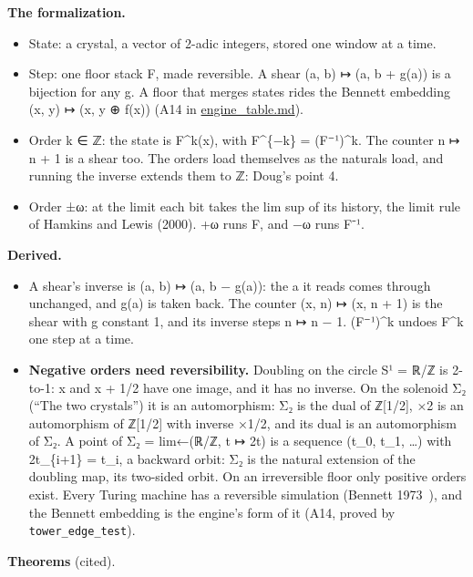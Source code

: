 \textbf{The formalization.}

\begin{itemize}
\item State: a crystal, a vector of 2-adic integers, stored one window at a time.
\item Step: one floor stack F, made reversible. A shear (a, b) ↦ (a, b + g(a)) is a bijection for any g. A floor that merges states rides the Bennett embedding (x, y) ↦ (x, y ⊕ f(x)) (A14 in \hyperref[chap:engine-table]{engine\_\allowbreak{}table.md}).
\item Order k ∈ ℤ: the state is F\textasciicircum{}k(x), with F\textasciicircum{}\{−k\} = (F⁻¹)\textasciicircum{}k. The counter n ↦ n + 1 is a shear too. The orders load themselves as the naturals load, and running the inverse extends them to ℤ: Doug's point 4.
\item Order ±ω: at the limit each bit takes the lim sup of its history, the limit rule of Hamkins and Lewis (2000). +ω runs F, and −ω runs F⁻¹.
\end{itemize}

\textbf{Derived.}

\begin{itemize}
\item A shear's inverse is (a, b) ↦ (a, b − g(a)): the a it reads comes through unchanged, and g(a) is taken back. The counter (x, n) ↦ (x, n + 1) is the shear with g constant 1, and its inverse steps n ↦ n − 1. (F⁻¹)\textasciicircum{}k undoes F\textasciicircum{}k one step at a time.
\item \textbf{Negative orders need reversibility.} Doubling on the circle S¹ = ℝ/ℤ is 2-to-1: x and x + 1/2 have one image, and it has no inverse. On the solenoid Σ₂ (“The two crystals”) it is an automorphism: Σ₂ is the dual of ℤ[1/2], ×2 is an automorphism of ℤ[1/2] with inverse ×1/2, and its dual is an automorphism of Σ₂. A point of Σ₂ = lim←(ℝ/ℤ, t ↦ 2t) is a sequence (t\_\allowbreak{}0, t\_\allowbreak{}1, …) with 2t\_\allowbreak{}\{i+1\} = t\_\allowbreak{}i, a backward orbit: Σ₂ is the natural extension of the doubling map, its two-sided orbit. On an irreversible floor only positive orders exist. Every Turing machine has a reversible simulation (Bennett 1973~\cite{src:Bennett-1973}), and the Bennett embedding is the engine's form of it (A14, proved by \texttt{tower\_\allowbreak{}edge\_\allowbreak{}test}).
\end{itemize}

\textbf{Theorems} (cited).

